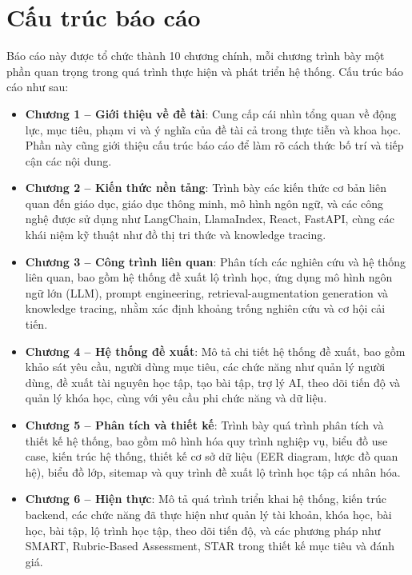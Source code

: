 \section{Cấu trúc báo cáo}

Báo cáo này được tổ chức thành 10 chương chính, mỗi chương trình bày một phần quan trọng trong quá trình thực hiện và phát triển hệ thống. Cấu trúc báo cáo như sau:

\begin{itemize}
    \item \textbf{Chương 1 – Giới thiệu về đề tài}: Cung cấp cái nhìn tổng quan về động lực, mục tiêu, phạm vi và ý nghĩa của đề tài cả trong thực tiễn và khoa học. Phần này cũng giới thiệu cấu trúc báo cáo để làm rõ cách thức bố trí và tiếp cận các nội dung.
    
    \item \textbf{Chương 2 – Kiến thức nền tảng}: Trình bày các kiến thức cơ bản liên quan đến giáo dục, giáo dục thông minh, mô hình ngôn ngữ, và các công nghệ được sử dụng như LangChain, LlamaIndex, React, FastAPI, cùng các khái niệm kỹ thuật như đồ thị tri thức và knowledge tracing.
    
    \item \textbf{Chương 3 – Công trình liên quan}: Phân tích các nghiên cứu và hệ thống liên quan, bao gồm hệ thống đề xuất lộ trình học, ứng dụng mô hình ngôn ngữ lớn (LLM), prompt engineering, retrieval-augmentation generation và knowledge tracing, nhằm xác định khoảng trống nghiên cứu và cơ hội cải tiến.
    
    \item \textbf{Chương 4 – Hệ thống đề xuất}: Mô tả chi tiết hệ thống đề xuất, bao gồm khảo sát yêu cầu, người dùng mục tiêu, các chức năng như quản lý người dùng, đề xuất tài nguyên học tập, tạo bài tập, trợ lý AI, theo dõi tiến độ và quản lý khóa học, cùng với yêu cầu phi chức năng và dữ liệu.
    
    \item \textbf{Chương 5 – Phân tích và thiết kế}: Trình bày quá trình phân tích và thiết kế hệ thống, bao gồm mô hình hóa quy trình nghiệp vụ, biểu đồ use case, kiến trúc hệ thống, thiết kế cơ sở dữ liệu (EER diagram, lược đồ quan hệ), biểu đồ lớp, sitemap và quy trình đề xuất lộ trình học tập cá nhân hóa.
    
    \item \textbf{Chương 6 – Hiện thực}: Mô tả quá trình triển khai hệ thống, kiến trúc backend, các chức năng đã thực hiện như quản lý tài khoản, khóa học, bài học, bài tập, lộ trình học tập, theo dõi tiến độ, và các phương pháp như SMART, Rubric-Based Assessment, STAR trong thiết kế mục tiêu và đánh giá.
    

\end{itemize}

